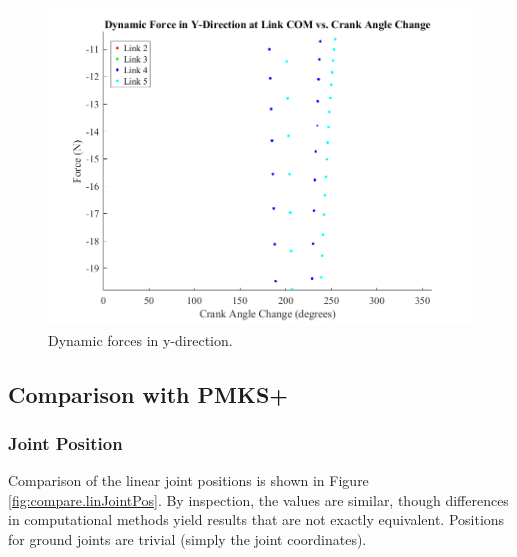 \documentclass[12pt]{article}
\begin{document}
\begin{figure}[H]
  \centering
  \includegraphics[scale=0.6]{../matlab-plots/dynamicForcesY.png}
  \caption{\label{fig:dyn-f-y}Dynamic forces in y-direction.}
\end{figure}




\subsection{Comparison with PMKS+}%
\label{res.compare}

\subsubsection{Joint Position}%
\label{res.compare.linJointPos}

Comparison of the linear joint positions is shown in Figure \ref{fig:compare.linJointPos}. By inspection, the values are similar, though differences in computational methods yield results that are not exactly equivalent. Positions for ground joints are trivial (simply the joint coordinates).
\end{document}
